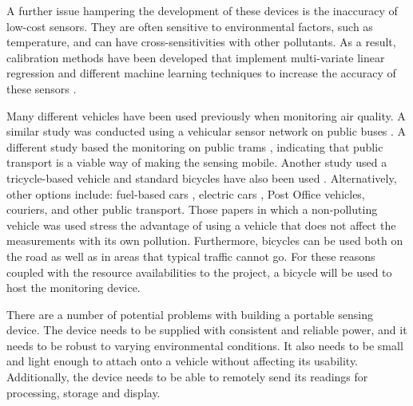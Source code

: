 \documentclass[11pt,twosided,a4paper]{report}
\begin{document}
A further issue hampering the development of these devices is the inaccuracy of low-cost sensors. They are often sensitive to environmental factors, such as temperature, and can have cross-sensitivities with other pollutants. As a result, calibration methods have been developed that implement multi-variate linear regression and different machine learning techniques to increase the accuracy of these sensors \citep{Spinelle2015fieldcalibrationa,Spinelle2017fieldcalibrationb,zimmerman2018machinelearning}.

Many different vehicles have been used previously when monitoring air quality. A similar study was conducted using a vehicular sensor network on public buses \citep{2014busairqualityVSN}. A different study based the monitoring on public trams \citep{Hagemann2014aerotram}, indicating that public transport is a viable way of making the sensing mobile. Another study used a tricycle-based vehicle \citep{Jabbar2017bikefossarchitecture} and standard bicycles have also been used \citep{Elen2013aeroflex,Peters2013cycleruns}. Alternatively, other options include: fuel-based cars \citep{Devarakonda2013,Apte2017googlestreetview}, electric cars \citep{Hagler2010durhamallelectric}, Post Office vehicles, couriers, and other public transport. Those papers in which a non-polluting vehicle was used stress the advantage of using a vehicle that does not affect the measurements with its own pollution. Furthermore, bicycles can be used both on the road as well as in areas that typical traffic cannot go. For these reasons coupled with the resource availabilities to the project, a bicycle will be used to host the monitoring device.

There are a number of potential problems with building a portable sensing device. The device needs to be supplied with consistent and reliable power, and it needs to be robust to varying environmental conditions. It also needs to be small and light enough to attach onto a vehicle without affecting its usability. Additionally, the device needs to be able to remotely send its readings for processing, storage and display.
\end{document}
